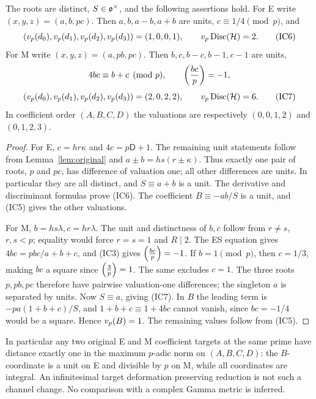 \begin{theorem}\label{thm:clusters}
The roots are distinct, $S\in\mathfrak o^\times$, and the following assertions hold.
For E write $(x,y,z)=(a,b,pc)$. Then $a,b,a-b,a+b$ are units,
$c\equiv1/4\pmod p$, and
\[
 (v_p(d_0),v_p(d_1),v_p(d_2),v_p(d_3))=(1,0,0,1),
 \qquad v_p\operatorname{Disc}(\mathcal H)=2.                         \tag{IC6}
\]
For M write $(x,y,z)=(a,pb,pc)$. Then $b,c,b-c,b-1,c-1$ are units,
\[
 4bc\equiv b+c\pmod p,\qquad\left(\frac{bc}{p}\right)=-1,
\]
\[
 (v_p(d_0),v_p(d_1),v_p(d_2),v_p(d_3))=(2,0,2,2),
 \qquad v_p\operatorname{Disc}(\mathcal H)=6.                         \tag{IC7}
\]
In coefficient order $(A,B,C,D)$ the valuations are respectively
$(0,0,1,2)$ and $(0,1,2,3)$.
\end{theorem}
\begin{proof}
For E, $c=hr\kappa$ and $4c=p\mathsf D+1$. The remaining unit statements follow
from Lemma~\ref{lem:original} and $a\pm b=hs(r\pm\kappa)$.
Thus exactly one pair of roots, $p$ and $pc$, has difference of valuation one;
all other differences are units. In particular they are all distinct, and
$S\equiv a+b$ is a unit. The derivative and discriminant formulas prove (IC6).
The coefficient $B\equiv-ab/S$ is a unit, and (IC5) gives the other valuations.

For M, $b=hs\lambda,c=hr\lambda$. The unit and distinctness of $b,c$ follow from
$r\ne s$, $r,s<p$; equality would force $r=s=1$ and $R\mid2$.
The ES equation gives $4bc=pbc/a+b+c$, and (IC3) gives $\left(\frac{bc}{p}\right)=-1$.
If $b=1\pmod p$, then $c=1/3$, making $bc$ a square since $\left(\frac{3}{p}\right)=1$.
The same excludes $c=1$. The three roots $p,pb,pc$ therefore have pairwise
valuation-one differences; the singleton $a$ is separated by units. Now
$S\equiv a$, giving (IC7). In $B$ the leading term is
$-pa(1+b+c)/S$, and $1+b+c\equiv1+4bc$ cannot vanish, since $bc=-1/4$
would be a square. Hence $v_p(B)=1$. The remaining values follow from (IC5).
\end{proof}

In particular any two original E and M coefficient targets at the same prime
have distance exactly one in the maximum $p$-adic norm on $(A,B,C,D)$: the
$B$-coordinate is a unit on E and divisible by $p$ on M, while all coordinates
are integral. An infinitesimal target deformation preserving reduction is not
such a channel change. No comparison with a complex Gamma metric is inferred.

